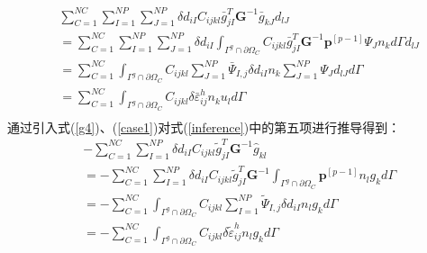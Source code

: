 \begin{equation}\label{CH4-barK}
\begin{split}
    &\sum_{C=1}^{N\!C}\sum_{I=1}^{N\!P}\sum_{J=1}^{N\!P}\delta d_{iI}C_{ijkl}\bar{g}^T_{jI}\pmb{G}^{-1}\bar{g}_{kJ}d_{lJ}\\
    &=\sum_{C=1}^{N\!C}\sum_{I=1}^{N\!P}\sum_{J=1}^{N\!P}\delta d_{iI}\int_{\Gamma^g\cap\partial\Omega_C}C_{ijkl}\bar{g}_{jI}^T\pmb{G}^{-1}\pmb{p}^{[p-1]}\Psi_Jn_kd\Gamma d_{lJ}\\
    &=\sum_{C=1}^{N\!C}\int_{\Gamma^g\cap\partial\Omega_C}C_{ijkl}\sum_{J=1}^{N\!P}\bar{\Psi}_{I,j}\delta d_{iI}n_k\sum_{J=1}^{N\!P}\Psi_{J}d_{lJ}d\Gamma\\
    &=\sum_{C=1}^{N\!C}\int_{\Gamma^g\cap\partial\Omega_C}C_{ijkl}\delta\bar{\varepsilon}_{ij}^hn_ku_ld\Gamma\\
\end{split}
\end{equation}
通过引入式(\ref{g4})、(\ref{case1})对式(\ref{inference})中的第五项进行推导得到：
\begin{equation}\label{CH4-tildef}
\begin{split}
    &-\sum_{C=1}^{N\!C}\sum_{I=1}^{N\!P}\delta d_{iI}C_{ijkl}\tilde{g}^T_{jI}\pmb{G}^{-1}\hat{g}_{kl}\\
    &=-\sum_{C=1}^{N\!C}\sum_{I=1}^{N\!P}\delta d_{iI}C_{ijkl}\tilde{g}^T_{jI}\pmb{G}^{-1}\int_{\Gamma^g\cap\partial\Omega_C}\pmb{p}^{[p-1]}n_lg_kd\Gamma\\
    &=-\sum_{C=1}^{N\!C}\int_{\Gamma^g\cap\partial\Omega_C}C_{ijkl}\sum_{I=1}^{N\!P}\tilde{\Psi}_{I,j}\delta d_{iI}n_lg_kd\Gamma\\
    &=-\sum_{C=1}^{N\!C}\int_{\Gamma^g\cap\partial\Omega_C}C_{ijkl}\delta\tilde{\varepsilon}_{ij}^hn_lg_kd\Gamma\\
\end{split}
\end{equation}
